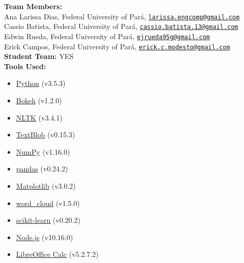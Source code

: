 \documentclass{article}
\title{}
\author{
    Entry Name: \textbf{``LCEE-MC3''}\\
    \textbf{VAST Challenge 2019}\\
    \textbf{\underline{Mini-Challenge 3}}}
\date{}
\begin{document}
\maketitle

\noindent
\textbf{Team Members:}\\
Ana Larissa Dias, Federal University of Par\'{a}, \href{mailto:larissa.engcomp@gmail.com}  {\texttt{larissa.engcomp@gmail.com}}   \\
Cassio Batista,   Federal University of Par\'{a}, \href{mailto:cassio.batista.13@gmail.com}{\texttt{cassio.batista.13@gmail.com}} \\
Edwin Rueda,      Federal University of Par\'{a}, \href{mailto:ejrueda95g@gmail.com}       {\texttt{ejrueda95g@gmail.com}}        \\
Erick Campos,     Federal University of Par\'{a}, \href{mailto:erick.c.modesto@gmail.com}  {\texttt{erick.c.modesto@gmail.com}}   \\

\noindent
\textbf{Student Team:} YES \\

\noindent
\textbf{Tools Used:}
\begin{itemize}
    \item \href{https://www.python.org/downloads/}     {Python}           (v3.5.3)
    \item \href{https://bokeh.pydata.org/en/latest/}   {Bokeh}            (v1.2.0)
    \item \href{https://www.nltk.org/}                 {NLTK}             (v3.4.1)
    \item \href{https://textblob.readthedocs.io/}      {TextBlob}         (v0.15.3)
    \item \href{https://www.numpy.org/}                {NumPy}            (v1.16.0)
    \item \href{https://pandas.pydata.org/}            {pandas}           (v0.24.2)
    \item \href{https://matplotlib.org/}               {Matplotlib}       (v3.0.2)
    \item \href{https://github.com/amueller/word_cloud}{word\_cloud}      (v1.5.0)
    \item \href{https://scikit-learn.org/stable/}      {scikit-learn}     (v0.20.2)
    \item \href{https://nodejs.org/en/download/}       {Node.js}          (v10.16.0)
    \item \href{https://vaietefuder.com}               {LibreOffice Calc} (v5.2.7.2)
\end{itemize}
\end{document}
